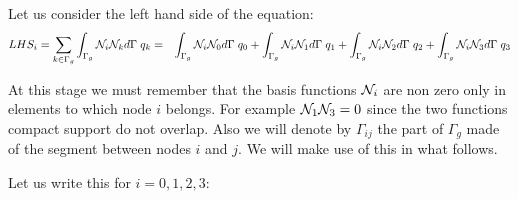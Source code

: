 Let us consider the left hand side of the equation:
\begin{eqnarray}
LHS_i= \sum_{k \in \Gamma_g} \int_{\Gamma_g} {\mathcal{N}}_i {\mathcal{N}}_k d\Gamma \; q_k
&=&
\int_{\Gamma_g} {\mathcal{N}}_i {\mathcal{N}}_0 d\Gamma \; q_0 +
\int_{\Gamma_g} {\mathcal{N}}_i {\mathcal{N}}_1 d\Gamma \; q_1 +
\int_{\Gamma_g} {\mathcal{N}}_i {\mathcal{N}}_2 d\Gamma \; q_2 +
\int_{\Gamma_g} {\mathcal{N}}_i {\mathcal{N}}_3 d\Gamma \; q_3 \nonumber
\end{eqnarray}

At this stage we must remember that the basis functions ${\mathcal{N}}_i$ are non zero only
in elements to which node $i$ belongs. For example ${\mathcal{N}}_1{\mathcal{N}}_3=0$ since the two 
functions compact support do not overlap. 
Also we will denote by $\Gamma_{ij}$ the part of $\Gamma_g$ made of the segment
between nodes $i$ and $j$. We will make use of this in what follows.



Let us write this for $i=0,1,2,3$:

